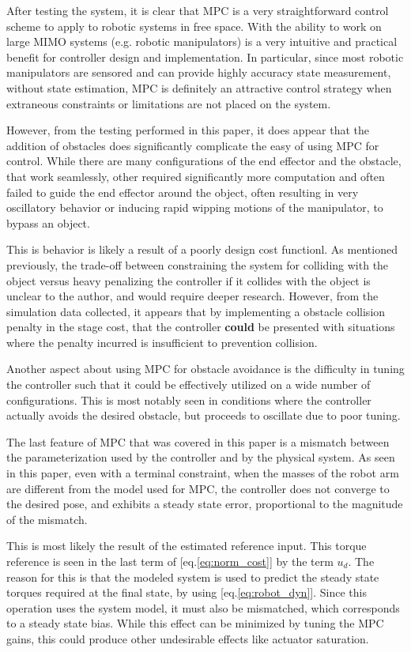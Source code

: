 \documentclass[journal]{IEEEtran}
\begin{document}
After testing the system, it is clear that MPC is a very straightforward control scheme to apply to robotic systems in free space. With the ability to work on large MIMO systems (e.g. robotic manipulators) is a very intuitive and practical benefit for controller design and implementation. In particular, since most robotic manipulators are sensored and can provide highly accuracy state measurement, without state estimation, MPC is definitely an attractive control strategy when extraneous constraints or limitations are not placed on the system.

However, from the testing performed in this paper, it does appear that the addition of obstacles does significantly complicate the easy of using MPC for control. While there are many configurations of the end effector and the obstacle, that work seamlessly, other required significantly more computation and often failed to guide the end effector around the object, often resulting in very oscillatory behavior or inducing rapid wipping motions of the manipulator, to bypass an object.

This is behavior is likely a result of a poorly design cost functionl. As mentioned previously, the trade-off between constraining the system for colliding with the object versus heavy penalizing the controller if it collides with the object is unclear to the author, and would require deeper research. However, from the simulation data collected, it appears that by implementing a obstacle collision penalty in the stage cost, that the controller \textbf{could} be presented with situations where the penalty incurred is insufficient to prevention collision.

Another aspect about using MPC for obstacle avoidance is the difficulty in tuning the controller such that it could be effectively utilized on a wide number of configurations. This is most notably seen in conditions where the controller actually avoids the desired obstacle, but proceeds to oscillate due to poor tuning.

The last feature of MPC that was covered in this paper is a mismatch between the parameterization used by the controller and by the physical system. As seen in this paper, even with a terminal constraint, when the masses of the robot arm are different from the model used for MPC, the controller does not converge to the desired pose, and exhibits a steady state error, proportional to the magnitude of the mismatch.

This is most likely the result of the estimated reference input. This torque reference is seen in the last term of [eq.\ref{eq:norm_cost}] by the term $u_d$. The reason for this is that the modeled system is used to predict the steady state torques required at the final state, by using [eq.\ref{eq:robot_dyn}]. Since this operation uses the system model, it must also be mismatched, which corresponds to a steady state bias. While this effect can be minimized by tuning the MPC gains, this could produce other undesirable effects like actuator saturation.
\end{document}
